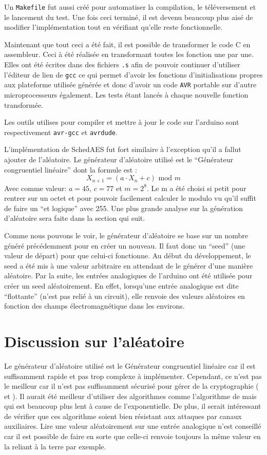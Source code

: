 \documentclass[letterpaper]{article}
\begin{document}
Un \texttt{Makefile} fut aussi créé pour automatiser la compilation, le téléversement et le lancement du test. Une fois ceci terminé, il est devenu beaucoup plus aisé de modifier l'implémentation tout en vérifiant qu'elle reste fonctionnelle. 

Maintenant que tout ceci a été fait, il est possible de transformer le code C en assembleur.
Ceci à été réalisée en transformant toutes les fonction une par une.
Elles ont été écrites dans des fichiers \texttt{.s} afin de pouvoir continuer d'utiliser l'éditeur de lien de \texttt{gcc} ce qui permet d'avoir les fonctions d'initialisations propres aux plateforme utilisée générée et donc d'avoir un code \texttt{AVR} portable sur d'autre microprocesseurs également.
Les tests étant lancés à chaque nouvelle fonction transformée.

Les outils utilises pour compiler et mettre à jour le code sur l'arduino sont respectivement \texttt{avr-gcc} et \texttt{avrdude}.

L'implémentation de SchedAES fut fort similaire à l'exception qu'il a fallut ajouter de l'aléatoire.
Le générateur d'aléatoire utilisé est le ``Générateur congruentiel linéaire'' dont la formule est :
$$ X_{n+1} = (a \cdot X_n  + c) \text{ mod } m$$
Avec comme valeur: $a=45$, $c=77$ et $m=2^8$. Le m a été choisi si petit pour rentrer sur un octet et pour pouvoir facilement calculer le modulo vu qu'il suffit de faire un ``et logique'' avec 255.
Une plus grande analyse sur la génération d'aléatoire sera faite dans la section qui suit.

Comme nous pouvons le voir, le générateur d'aléatoire se base sur un nombre généré précédemment pour en créer un nouveau.
Il faut donc un ``seed'' (une valeur de départ) pour que celui-ci fonctionne.
Au début du développement, le seed a été mis à une valeur arbitraire en attendant de le générer d'une manière aléatoire.
Par la suite, les entrées analogiques de l'arduino ont été utilisée pour créer un seed aléatoirement.
En effet, lorsqu'une entrée analogique est dite ``flottante'' (n'est pas relié à un circuit), elle renvoie des valeurs aléatoires en fonction des champs électromagnétique dans les environs.

\section{Discussion sur l'aléatoire}
\label{sec:rand}
Le générateur d'aléatoire utilisé est le Générateur congruentiel linéaire car il est suffisamment rapide et pas trop complexe à implémenter.
Cependant, ce n'est pas le meilleur car il n'est pas suffisamment sécurisé pour gérer de la cryptographie (\cite{stern1987secret} et \cite{Plumstead1983}).
Il aurait été meilleur d'utiliser des algorithmes comme l'algorithme de \cite{blum1984generate} mais qui est beaucoup plus lent à cause de l'exponentielle.
De plus, il serait intéressant de vérifier que ces algorithme soient bien résistant aux attaques par canaux auxiliaires.
Lire une valeur aléatoirement sur une entrée analogique n'est conseillé car il est possible de faire en sorte que celle-ci renvoie toujours la même valeur en la reliant à la terre par exemple.
\end{document}
